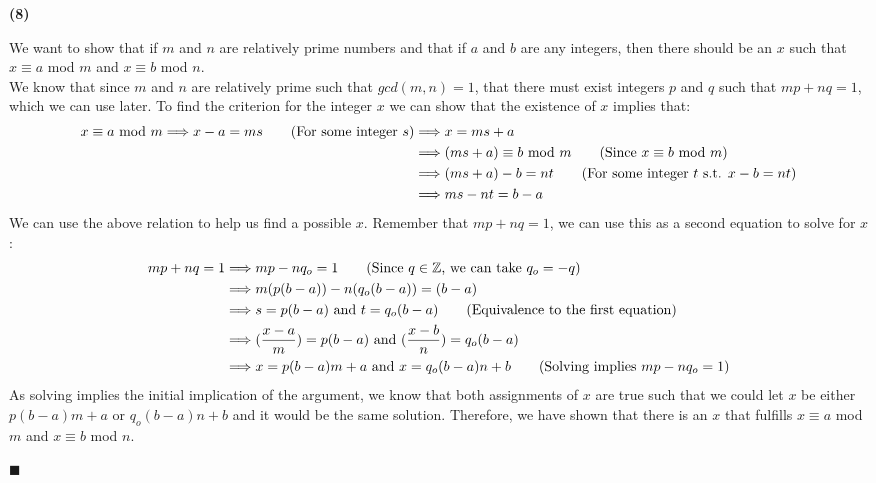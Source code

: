 \documentclass[20pt]{article}
\begin{document}
\noindent
\textbf{(8)}
\begin{text}
    We want to show that if $m$ and $n$ are relatively prime numbers and that if $a$ and $b$ are any integers, then there should be an $x$ such that $x \equiv a$ mod $m$ and $x \equiv b$ mod $n$.\\

    \noindent
    We know that since $m$ and $n$ are relatively prime such that $gcd(m, n) = 1$, that there must exist integers $p$ and $q$ such that $mp + nq = 1$, which we can use later. To find the criterion for the integer $x$ we can show that the existence of $x$ implies that:
    \begin{align}
        x \equiv a \text{ mod } m \Longrightarrow x - a = ms\tag{For some integer $s$} &\Longrightarrow x = ms + a\nonumber\\
        &\Longrightarrow (ms + a) \equiv b \text{ mod } m\tag{Since $x \equiv b \text{ mod } m$}\nonumber\\
        &\Longrightarrow (ms + a) - b = nt \tag{For some integer $t$ s.t. $x - b = nt$}\nonumber\\
        &\Longrightarrow ms - nt = b - a\nonumber
    \end{align}
    We can use the above relation to help us find a possible $x$. Remember that $mp + nq = 1$, we can use this as a second equation to solve for $x$:
    \begin{align}
        mp + nq = 1 &\Longrightarrow mp - nq_o = 1\tag{Since $q \in \mathbb{Z}$, we can take $q_o = -q$}\nonumber\\
        &\Longrightarrow m(p(b - a)) - n(q_o(b - a)) = (b - a)\nonumber\\
        &\Longrightarrow s = p(b - a) \text{ and } t = q_o(b - a)\tag{Equivalence to the first equation}\nonumber\\
        &\Longrightarrow (\frac{x - a}{m}) = p(b - a) \text{ and } (\frac{x - b}{n}) = q_o(b - a)\nonumber\\
        &\Longrightarrow x = p(b - a)m + a \text{ and } x = q_o(b - a)n + b\tag{Solving implies $mp - nq_o = 1$}\nonumber
    \end{align}
    As solving implies the initial implication of the argument, we know that both assignments of $x$ are true such that we could let $x$ be either $p(b - a)m + a \text{ or } q_o(b - a)n + b$ and it would be the same solution. Therefore, we have shown that there is an $x$ that fulfills $x \equiv a$ mod $m$ and $x \equiv b$ mod $n$.
    
    \hfill $\blacksquare$
\end{text}\\
\end{document}
